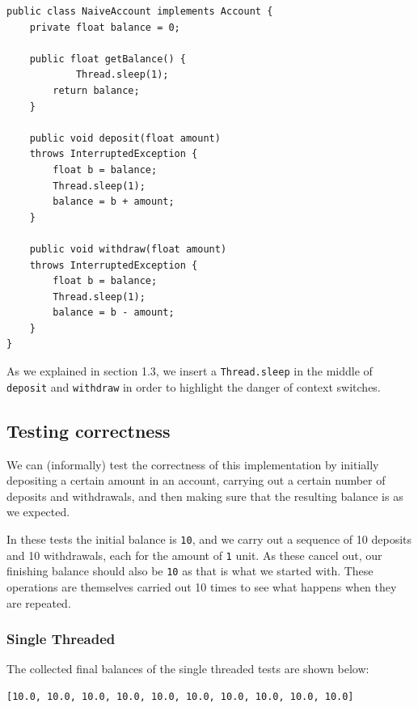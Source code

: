 \documentclass[a4paper,12pt]{kth-mag}
\begin{document}
\begin{listing}[H]
	\begin{verbatim}
public class NaiveAccount implements Account {
    private float balance = 0;

    public float getBalance() {
    		Thread.sleep(1);
        return balance;
    }

    public void deposit(float amount) 
    throws InterruptedException {
        float b = balance;
        Thread.sleep(1);
        balance = b + amount;
    }

    public void withdraw(float amount) 
    throws InterruptedException {
        float b = balance;
        Thread.sleep(1);
        balance = b - amount;
    }
}  
	\end{verbatim}
\end{listing}

As we explained in section 1.3, we insert a \texttt{Thread.sleep} in the middle of \texttt{deposit} and \texttt{withdraw} in order to highlight the danger of context switches.

\subsection{Testing correctness}

We can (informally) test the correctness of this implementation by initially depositing a certain amount in an account, carrying out a certain number of deposits and withdrawals, and then making sure that the resulting balance is as we expected.

In these tests the initial balance is \texttt{10}, and we carry out a sequence of 10 deposits and 10 withdrawals, each for the amount of \texttt{1} unit. As these cancel out, our finishing balance should also be \texttt{10} as that is what we started with. These operations are themselves carried out 10 times to see what happens when they are repeated.

\subsubsection{Single Threaded}

The collected final balances of the single threaded tests are shown below:

\begin{listing}[H]
	\begin{verbatim}
[10.0, 10.0, 10.0, 10.0, 10.0, 10.0, 10.0, 10.0, 10.0, 10.0]
	\end{verbatim}
\end{listing}
\end{document}
